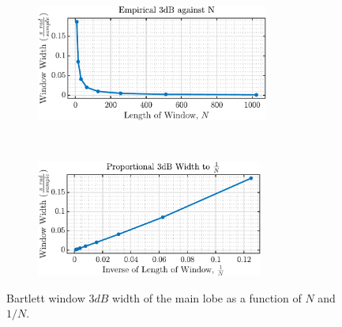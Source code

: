 \begin{enumerate}[label=\alph*), leftmargin=*]
\begin{figure}[h]
    \centering
    \begin{subfigure}{0.49\textwidth}
        \centering
        \includegraphics[height=1.5in]{report/spectrum-estimation/resolution-and-leakage-of-periodogram-based-methods/assets/a/bartlett-3db-vs-N}
    \end{subfigure}
    ~ 
    \begin{subfigure}{0.49\textwidth}
        \centering
        \includegraphics[height=1.5in]{report/spectrum-estimation/resolution-and-leakage-of-periodogram-based-methods/assets/a/bartlett-3db-vs-1_over_N}
    \end{subfigure}
    \caption{Bartlett window $3dB$ width of the main lobe as a function of $N$ and $1/N$.}
    \label{fig:1_3_a_2}
\end{figure}



\end{enumerate}
